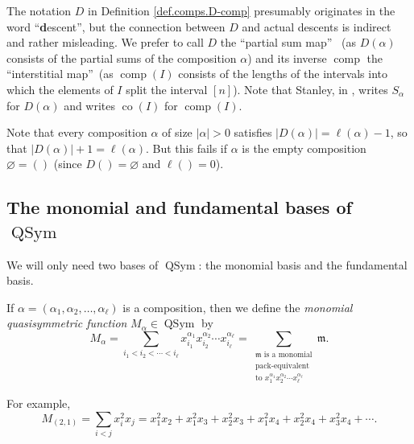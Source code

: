 \documentclass[numbers=enddot,12pt,final,onecolumn,notitlepage]{scrartcl}%
\theoremstyle{definition}
\let\sumnonlimits\sum
\renewcommand{\sum}{\sumnonlimits\limits}
\begin{document}
The notation $D$ in Definition \ref{def.comps.D-comp} presumably originates in
the word \textquotedblleft\textbf{d}escent\textquotedblright, but the
connection between $D$ and actual descents is indirect and rather misleading.
We prefer to call $D$ the \textquotedblleft partial sum map\textquotedblright%
\ (as $D\left(  \alpha\right)  $ consists of the partial sums of the
composition $\alpha$) and its inverse $\operatorname*{comp}$ the
\textquotedblleft interstitial map\textquotedblright\ (as
$\operatorname*{comp}\left(  I\right)  $ consists of the lengths of the
intervals into which the elements of $I$ split the interval $\left[  n\right]
$). Note that Stanley, in \cite[\S 7.19]{Stanley-EC2}, writes $S_{\alpha}$ for
$D\left(  \alpha\right)  $ and writes $\operatorname*{co}\left(  I\right)  $
for $\operatorname*{comp}\left(  I\right)  $.

Note that every composition $\alpha$ of size $\left\vert \alpha\right\vert >0$
satisfies $\left\vert D\left(  \alpha\right)  \right\vert =\ell\left(
\alpha\right)  -1$, so that $\left\vert D\left(  \alpha\right)  \right\vert
+1=\ell\left(  \alpha\right)  $. But this fails if $\alpha$ is the empty
composition $\varnothing=\left(  {}\right)  $ (since $D\left(  {}\right)
=\varnothing$ and $\ell\left(  {}\right)  =0$).

\subsection{The monomial and fundamental bases of $\operatorname*{QSym}$}

We will only need two bases of $\operatorname*{QSym}$: the monomial basis and
the fundamental basis.

If $\alpha=\left(  \alpha_{1},\alpha_{2},\ldots,\alpha_{\ell}\right)  $ is a
composition, then we define the \emph{monomial quasisymmetric function}
$M_{\alpha}\in\operatorname*{QSym}$ by%
\begin{equation}
M_{\alpha}=\sum_{i_{1}<i_{2}<\cdots<i_{\ell}}x_{i_{1}}^{\alpha_{1}}x_{i_{2}%
}^{\alpha_{2}}\cdots x_{i_{\ell}}^{\alpha_{\ell}}=\sum_{\substack{\mathfrak{m}%
\text{ is a monomial}\\\text{pack-equivalent}\\\text{to }x_{1}^{\alpha_{1}%
}x_{2}^{\alpha_{2}}\cdots x_{\ell}^{\alpha_{\ell}}}}\mathfrak{m}.
\label{eq.Malpha.def}%
\end{equation}


For example,%
\[
M_{\left(  2,1\right)  }=\sum_{i<j}x_{i}^{2}x_{j}=x_{1}^{2}x_{2}+x_{1}%
^{2}x_{3}+x_{2}^{2}x_{3}+x_{1}^{2}x_{4}+x_{2}^{2}x_{4}+x_{3}^{2}x_{4}+\cdots.
\]
\end{document}
